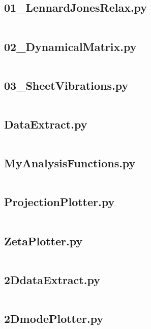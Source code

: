 \subsection{01\_LennardJonesRelax.py}
\inputminted[python3=true,bgcolor=Black,linenos=true]{python}{VNL/PythonScripts/Scripts/01_LennardJonesRelax.py}
\subsection{02\_DynamicalMatrix.py}
\inputminted[python3=true,bgcolor=Black,linenos=true]{python}{VNL/PythonScripts/Scripts/02_DynamicalMatrix.py}
\subsection{03\_SheetVibrations.py}
\inputminted[python3=true,bgcolor=Black,linenos=true]{python}{VNL/PythonScripts/Scripts/03_SheetVibrations.py}
\subsection{DataExtract.py}
\inputminted[python3=true,bgcolor=Black,linenos=true]{python}{VNL/PythonScripts/Scripts/DataExtract.py}
\subsection{MyAnalysisFunctions.py}
\inputminted[python3=true,bgcolor=Black,linenos=true]{python}{VNL/PythonScripts/Scripts/MyAnalysisFunctions.py}
\subsection{ProjectionPlotter.py}
\inputminted[python3=true,bgcolor=Black,linenos=true]{python}{VNL/PythonScripts/Scripts/ProjectionPlotter.py}
\subsection{ZetaPlotter.py}
\inputminted[python3=true,bgcolor=Black,linenos=true]{python}{VNL/PythonScripts/Scripts/ZetaPlotter.py}
\subsection{2DdataExtract.py}
\inputminted[python3=true,bgcolor=Black,linenos=true]{python}{VNL/PythonScripts/Scripts/2DdataExtract.py}
\subsection{2DmodePlotter.py}
\inputminted[python3=true,bgcolor=Black,linenos=true]{python}{VNL/PythonScripts/Scripts/2DmodePlotter.py}